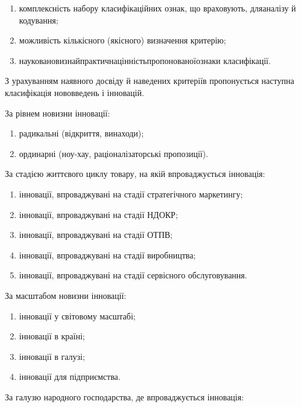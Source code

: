 \begin{enumerate}
	\item комплексність набору класифікаційних ознак, що враховують, для\newline \hspace*{-18mm}аналізу й кодування;
	\item можливість кількісного (якісного) визначення критерію;
	\item наукова\hfill новизна\hfill й\hfill практична\hfill цінність\hfill пропонованої\hfill ознаки\newline \hspace*{-20mm} класифікації.
\end{enumerate}

З урахуванням наявного досвіду й наведених критеріїв пропонується наступна класифікація нововведень і інновацій.

За рівнем новизни інновації:

\begin{enumerate}
	\item радикальні (відкриття, винаходи);
	\item ординарні (ноу-хау, раціоналізаторські пропозиції).
\end{enumerate}

За стадією життєвого циклу товару, на якій впроваджується інновація:

\begin{enumerate}
	\item інновації, впроваджувані на стадії стратегічного маркетингу;
	\item інновації, впроваджувані на стадії НДОКР;
	\item інновації, впроваджувані на стадії ОТПВ;
	\item інновації, впроваджувані на стадії виробництва;
	\item інновації, впроваджувані на стадії сервісного обслуговування.
\end{enumerate}

За масштабом новизни інновації:

\begin{enumerate}
	\item інновації у світовому масштабі;
	\item інновації в країні;
	\item інновації в галузі;
	\item інновації для підприємства.
\end{enumerate}

За галузю народного господарства, де впроваджується інновація:

